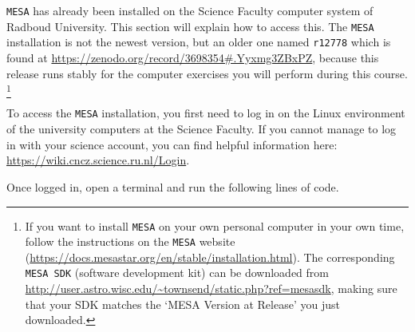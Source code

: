 \documentclass[11pt,a4paper]{article}
\begin{document}
\texttt{MESA} has already been installed on the Science Faculty computer system of Radboud University. This section will explain how to access this. The \texttt{MESA} installation is not the newest version, but an older one named \texttt{r12778} which is found at \url{https://zenodo.org/record/3698354#.Yyxmg3ZBxPZ}, because this release runs stably for the computer exercises you will perform during this course.
\footnote{If you want to install \texttt{MESA} on your own personal computer in your own time, follow the instructions on the \texttt{MESA} website (\url{https://docs.mesastar.org/en/stable/installation.html}). The corresponding \texttt{MESA SDK} (software development kit) can be downloaded from \url{http://user.astro.wisc.edu/~townsend/static.php?ref=mesasdk}, making sure that your SDK matches the `MESA Version at Release' you just downloaded. }

\bigskip\noindent
To access the \texttt{MESA} installation, you first need to log in on the Linux environment of the university computers at the Science Faculty. If you cannot manage to log in with your science account, you can find helpful information here: \url{https://wiki.cncz.science.ru.nl/Login}. 

\bigskip\noindent
Once logged in, open a terminal and run the following lines of code. 
\end{document}
